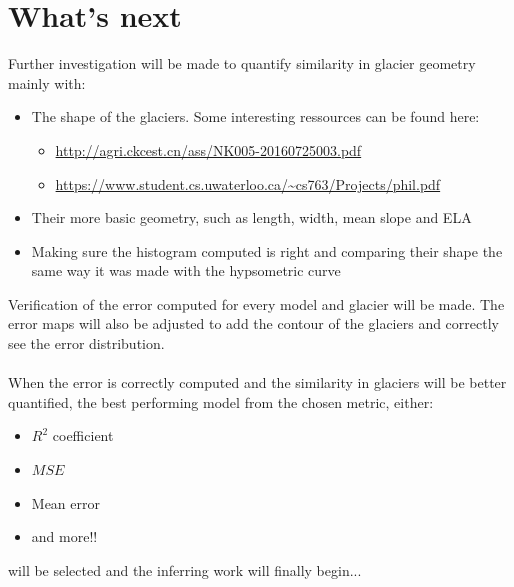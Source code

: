\documentclass[a4, 12pt]{article}
\begin{document}
\section{What's next}
Further investigation will be made to quantify similarity in glacier geometry mainly with:\\
\begin{itemize}
	\item The shape of the glaciers. Some interesting ressources can be found here:
	\begin{itemize}
		\item \url{http://agri.ckcest.cn/ass/NK005-20160725003.pdf}
		\item \url{https://www.student.cs.uwaterloo.ca/~cs763/Projects/phil.pdf}
	\end{itemize}
	\item Their more basic geometry, such as length, width, mean slope and ELA
	\item Making sure the histogram computed is right and comparing their shape the same way it was made with the hypsometric curve
\end{itemize}
Verification of the error computed for every model and glacier will be made. The error maps will also be adjusted to add the contour of the glaciers and correctly see the error distribution.\\
\\
When the error is correctly computed and the similarity in glaciers will be better quantified, the best performing model from the chosen metric, either:
\begin{itemize}
\item $R^2$ coefficient
\item $MSE$
\item Mean error
\item and more!!
\end{itemize}
will be selected and the inferring work will finally begin...
\end{document}
